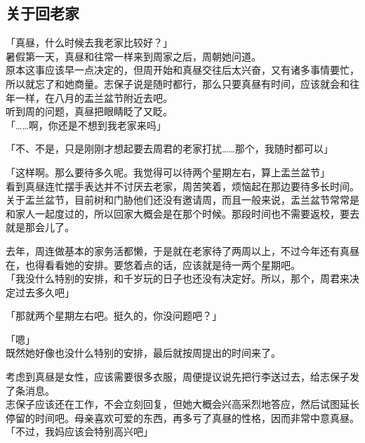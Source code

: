 \subsection{关于回老家}

「真昼，什么时候去我老家比较好？」\\

暑假第一天，真昼和往常一样来到周家之后，周朝她问道。\\

原本这事应该早一点决定的，但周开始和真昼交往后太兴奋，又有诸多事情要忙，所以就忘了和她商量。志保子说是随时都行，那么只要真昼有时间，应该就会和往年一样，在八月的盂兰盆节附近去吧。\\

听到周的问题，真昼把眼睛眨了又眨。\\

「……啊，你还是不想到我老家来吗」

「不、不是，只是刚刚才想起要去周君的老家打扰……那个，我随时都可以」

「这样啊。那么要待多久呢。我觉得可以待两个星期左右，算上盂兰盆节」\\

看到真昼连忙摆手表达并不讨厌去老家，周苦笑着，烦恼起在那边要待多长时间。\\

关于盂兰盆节，目前树和门胁他们还没有邀请周，而且一般来说，盂兰盆节常常是和家人一起度过的，所以回家大概会是在那个时候。那段时间也不需要返校，要去就是那会儿了。

去年，周连做基本的家务活都懒，于是就在老家待了两周以上，不过今年还有真昼在，也得看看她的安排。要悠着点的话，应该就是待一两个星期吧。\\

「我没什么特别的安排，和千岁玩的日子也还没有决定好。所以，那个，周君来决定过去多久吧」

「那就两个星期左右吧。挺久的，你没问题吧？」

「嗯」\\

既然她好像也没什么特别的安排，最后就按周提出的时间来了。

考虑到真昼是女性，应该需要很多衣服，周便提议说先把行李送过去，给志保子发了条消息。\\

志保子应该还在工作，不会立刻回复，但她大概会兴高采烈地答应，然后试图延长停留的时间吧。母亲喜欢可爱的东西，再多亏了真昼的性格，因而非常中意真昼。\\

「不过，我妈应该会特别高兴吧」


